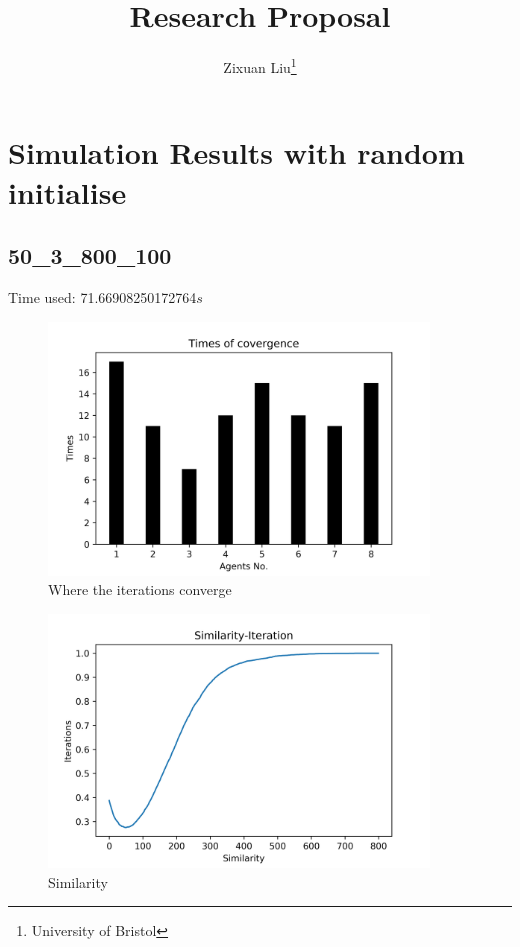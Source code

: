 \documentclass[a4paper,12pt]{article}
\title{Research Proposal}
\author{Zixuan Liu\thanks{University of Bristol}}
\begin{document}
	\section{Simulation Results with random initialise}
	\graphicspath{{figs/}}
	\subsection{50\_3\_800\_100}
	Time used: 71.66908250172764${s}$
	\begin{figure}[H]
		\centering
		\includegraphics[width=0.9\textwidth]{agt50_3_800_100}
		\caption{Where the iterations converge}\label{agt50_3_800_100}
	\end{figure}
%
	\begin{figure}[H]
		\centering
		\includegraphics[width=0.9\textwidth]{Sim50_3_800_100}
		\caption{Similarity}\label{Sim50_3_800_100}
	\end{figure}
%
\end{document}
